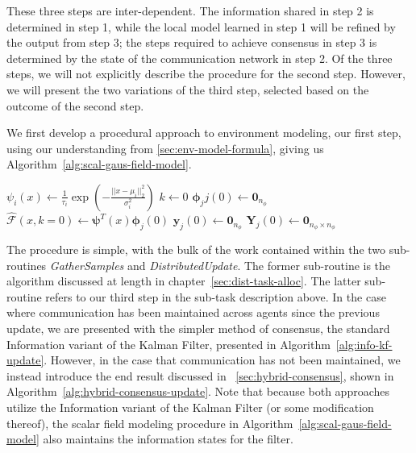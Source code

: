 These three steps are inter-dependent. The information shared in step 2 is determined in step 1, while the local model learned in step 1 will be refined by the output from step 3; the steps required to achieve consensus in step 3 is determined by the state of the communication network in step 2. Of the three steps, we will not explicitly describe the procedure for the second step. However, we will present the two variations of the third step, selected based on the outcome of the second step.

We first develop a procedural approach to environment modeling, our first step, using our understanding from \ref{sec:env-model-formula}, giving us Algorithm~\ref{alg:scal-gaus-field-model}.

\begin{algorithm}
\caption{Distributed Scalar Field Modeling of Environment at Agent $j$}\label{alg:scal-gaus-field-model}
$\psi_i(x) \gets \frac{1}{\tau_i}\exp\left(-\frac{||x-\mu_i||^2_2}{\sigma_i^2}\right)$\;
$k \gets 0$\;
$\bm{\phi}_jj(0) \gets \mathbf{0}_{n_{\phi}}$\;
$\hat{\mathcal{F}}(x,k=0) \gets \bm{\psi}^T(x)\bm{\phi}_j(0)$ 
$\bm{y}_j(0)\gets\bm{0}_{n_\phi}$\;
$\bm{Y}_j(0)\gets\bm{0}_{n_\phi\times n_\phi}$ 
\end{algorithm}

The procedure is simple, with the bulk of the work contained within the two sub-routines \textit{GatherSamples} and \textit{DistributedUpdate}. The former sub-routine is the algorithm discussed at length in chapter~\ref{sec:dist-task-alloc}. The latter sub-routine refers to our third step in the sub-task description above. In the case where communication has been maintained across agents since the previous update, we are presented with the simpler method of consensus, the standard Information variant of the Kalman Filter, presented in Algorithm~\ref{alg:info-kf-update}. However, in the case that communication has not been maintained, we instead introduce the end result discussed in ~\ref{sec:hybrid-consensus}, shown in Algorithm~\ref{alg:hybrid-consensus-update}. Note that because both approaches utilize the Information variant of the Kalman Filter (or some modification thereof), the scalar field modeling procedure in Algorithm~\ref{alg:scal-gaus-field-model} also maintains the information states for the filter.

